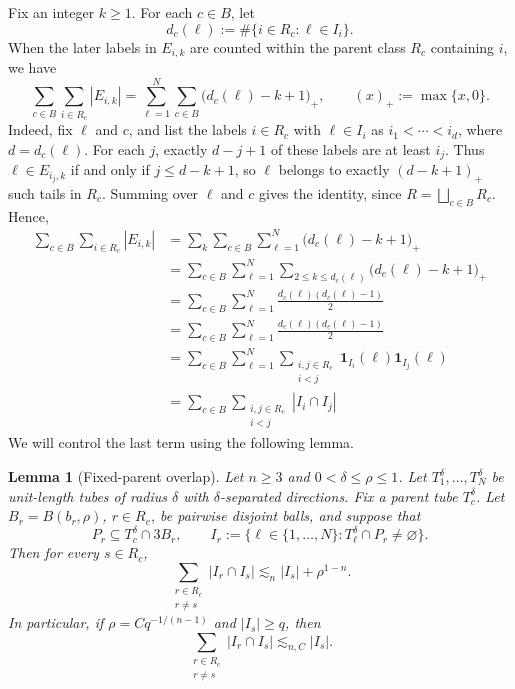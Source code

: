 \documentclass[11pt, letterpaper]{nyjm}
\newtheorem{lemma}[theorem]{Lemma}
\begin{document}
Fix an integer \(k\ge1\). For each \(c\in B\), let
\[
d_c(\ell):=\#\{i\in R_c:\ell\in I_i\}.
\]
When the later labels in \(E_{i,k}\) are counted within the parent
class \(R_c\) containing \(i\), we have
\[
\sum_{c \in B}\sum_{i\in R_c}|E_{i,k}|
=
\sum_{\ell=1}^{N}\sum_{c\in B}
\bigl(d_c(\ell)-k+1\bigr)_+,
\qquad (x)_+:=\max\{x,0\}.
\]
Indeed, fix \(\ell\) and \(c\), and list the labels \(i\in R_c\)
with \(\ell\in I_i\) as \(i_1<\cdots<i_d\), where \(d=d_c(\ell)\).
For each \(j\), exactly \(d-j+1\) of these labels are at least \(i_j\).
Thus \(\ell\in E_{i_j,k}\) if and only if \(j\le d-k+1\), so
\(\ell\) belongs to exactly \((d-k+1)_+\) such tails in \(R_c\).
Summing over \(\ell\) and \(c\) gives the identity, since
\(R=\bigsqcup_{c\in B}R_c\).
Hence,
\begin{equation} \label{eq:composition}
\begin{aligned}
\sum_{c \in B}\sum_{i\in R_c}|E_{i,k}|
&=
\sum_k\sum_{c\in B}\sum_{\ell=1}^{N}
\bigl(d_c(\ell)-k+1\bigr)_+ \\
&=
\sum_{c\in B}\sum_{\ell=1}^{N}
\sum_{2 \leq k \leq d_c(\ell)}\bigl(d_c(\ell)-k+1\bigr)_+ \\
&=
\sum_{c\in B}\sum_{\ell=1}^{N}
\frac{d_c(\ell)(d_c(\ell) - 1)}{2} \\
&=
\sum_{c\in B}\sum_{\ell=1}^{N}
\frac{d_c(\ell)(d_c(\ell) - 1)}{2} \\
&=\sum_{c\in B}\sum_{\ell=1}^{N}\sum_{\substack{i,j\in R_c\\i<j}}
\mathbf 1_{I_i}(\ell)\mathbf 1_{I_j}(\ell) \\
&=\sum_{c\in B}\sum_{\substack{i,j\in R_c\\i<j}}
|I_i \cap I_j|
\end{aligned} 
\end{equation}
We will control the last term using the following lemma. \begin{lemma}[Fixed-parent overlap] 		\label{lem:fixed-parent-overlap}
	Let \(n\ge3\) and \(0<\delta\le\rho\le1\). Let
	\(T_1^\delta,\ldots,T_N^\delta\) be unit-length tubes of radius
	\(\delta\) with \(\delta\)-separated directions. Fix a parent tube
	\(T_c^\delta\). Let \(B_r=B(b_r,\rho)\), \(r\in R_c\), be pairwise
	disjoint balls, and suppose that
	\[
	P_r\subseteq T_c^\delta\cap 3B_r,
	\qquad
	I_r:=\{\ell\in\{1,\ldots,N\}:T_\ell^\delta\cap P_r\ne\varnothing\}.
	\]
	Then for every \(s\in R_c\),
	\[
	\sum_{\substack{r\in R_c\\r\ne s}}|I_r\cap I_s|
	\lesssim_n |I_s|+\rho^{1-n}.
	\]
	In particular, if \(\rho=Cq^{-1/(n-1)}\) and \(|I_s|\ge q\), then
	\[
	\sum_{\substack{r\in R_c\\r\ne s}}|I_r\cap I_s|
	\lesssim_{n,C}|I_s|.
	\]
\end{lemma}
\end{document}
